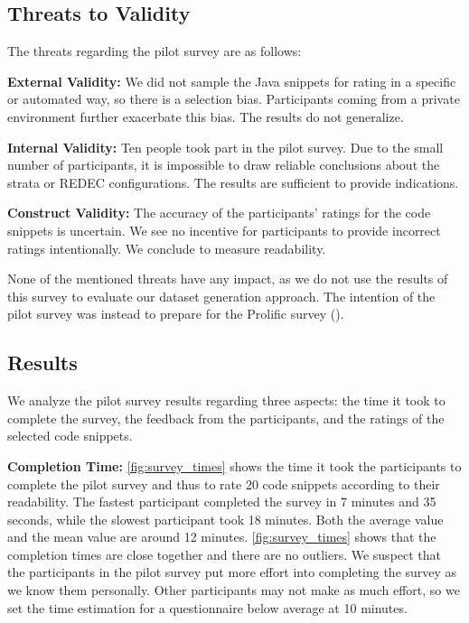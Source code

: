 \documentclass[%
class=scrreprt,
chapterprefix=false,%
open=right,%
twoside=true,%
paper=a4,%
logofile={Logo\_zentral\_farbig\_EN.png},%
thesistype=master,%
UKenglish,%
]{se2thesis}
\theoremstyle{definition}
\newcommand{\rdh}{REDEC\xspace}
\begin{document}
\subsection{Threats to Validity}
	The threats regarding the pilot survey are as follows:
		
	\textbf{External Validity:}
	We did not sample the Java snippets for rating in a specific or automated way, so there is a selection bias. Participants coming from a private environment further exacerbate this bias. The results do not generalize.

	\textbf{Internal Validity:} 
	Ten people took part in the pilot survey. Due to the small number of participants, it is impossible to draw reliable conclusions about the strata or \rdh configurations.     
	The results are sufficient to provide indications.

	\textbf{Construct Validity:}
	The accuracy of the participants' ratings for the code snippets is uncertain. We see no incentive for participants to provide incorrect ratings intentionally. We conclude to measure readability.

	None of the mentioned threats have any impact, as we do not use the results of this survey to evaluate our dataset generation approach.
	The intention of the pilot survey was instead to prepare for the Prolific survey ().
	
\subsection{Results}
	We analyze the pilot survey results regarding three aspects: the time it took to complete the survey, the feedback from the participants, and the ratings of the selected code snippets.

	\textbf{Completion Time:} 
    \autoref{fig:survey_times} shows the time it took the participants to complete the pilot survey and thus to rate 20 code snippets according to their readability.
    The fastest participant completed the survey in 7 minutes and 35 seconds, while the slowest participant took 18 minutes. 
    Both the average value and the mean value are around 12 minutes. \autoref{fig:survey_times} shows that the completion times are close together and there are no outliers.
    We suspect that the participants in the pilot survey put more effort into completing the survey as we know them personally. 
    Other participants may not make as much effort, so we set the time estimation for a questionnaire below average at 10 minutes.
		
\end{document}
